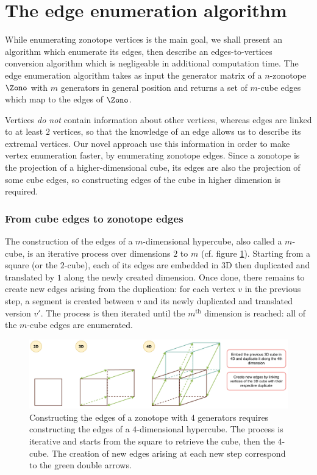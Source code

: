 \section{The edge enumeration algorithm}
\label{edge_enumeration_algorithm_section}

While enumerating zonotope vertices is the main goal, we shall present an algorithm which enumerate its edges, then describe an edges-to-vertices conversion algorithm which is negligeable in additional computation time. The edge enumeration algorithm takes as input the generator matrix of a $n$-zonotope $\Zono$ with $m$ generators in general position and returns a set of $m$-cube edges which map to the edges of $\Zono$.

Vertices \emph{do not} contain information about other vertices, whereas edges are linked to at least $2$ vertices, so that the knowledge of an edge allows us to describe its extremal vertices. Our novel approach use this information in order to make vertex enumeration faster, by enumerating zonotope edges. Since a zonotope is the projection of a higher-dimensional cube, its edges are also the projection of some cube edges, so constructing edges of the cube in higher dimension is required.

\subsubsection*{From cube edges to zonotope edges}

The construction of the edges of a $m$-dimensional hypercube, also called a $m$-cube, is an iterative process over dimensions $2$ to $m$ (cf. figure \ref{fig:cube_edge_construction}). Starting from a square (or the $2$-cube), each of its edges are embedded in 3D then duplicated and translated by $1$ along the newly created dimension. Once done, there remains to create new edges arising from the duplication: for each vertex $v$ in the previous step, a segment is created between $v$ and its newly duplicated and translated version $v'$. The process is then iterated until the $m^{\text{th}}$ dimension is reached: all of the $m$-cube edges are enumerated.

\begin{figure}[!htb]
    \captionsetup{justification=centering}
    \centering
    \includegraphics[trim={0 0 0 0},clip, width=1.0\linewidth]{img/chapter_2/zonotope_construction_from_cube_edge_duplication.pdf}
    \caption{Constructing the edges of a zonotope with $4$ generators requires constructing the edges of a $4$-dimensional hypercube. The process is iterative and starts from the square to retrieve the cube, then the $4$-cube. The creation of new edges arising at each new step correspond to the green double arrows.}
    \label{fig:cube_edge_construction}
\end{figure}


